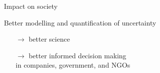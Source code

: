 \documentclass[english,t]{beamer}
\begin{document}
\begin{frame}{Impact on society}

  \vspace{\baselineskip}
    Better modelling and quantification of uncertainty\\
  \hspace{0.5cm}  \begin{minipage}[t]{0.8\linewidth}
  \vspace{0.5\baselineskip}
    
  \begin{itemize}
  \item[$\rightarrow$] better science
  \vspace{\baselineskip}
  
\item[$\rightarrow$] better informed decision making\\ in companies, government, and NGOs
\end{itemize}
  
\end{minipage}

\end{frame}


  

\end{document}
